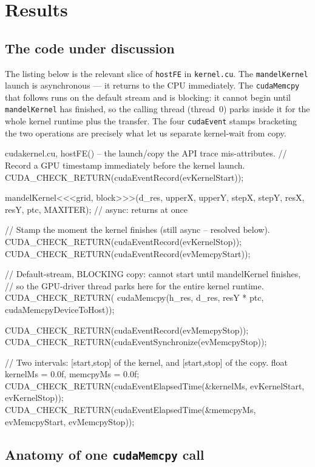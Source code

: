 \documentclass[
	english,
	letterpaper, oneside
]{article}
\begin{document}
\section{Results}

\subsection{The code under discussion}

The listing below is the relevant slice of \texttt{hostFE} in \texttt{kernel.cu}.
The \texttt{mandelKernel} launch is asynchronous --- it returns to the CPU
immediately. The \texttt{cudaMemcpy} that follows runs on the default
stream and is blocking: it cannot begin until \texttt{mandelKernel} has
finished, so the calling thread (thread~0) parks inside it for the whole kernel
runtime plus the transfer. The four \texttt{cudaEvent} stamps bracketing the two
operations are precisely what let us separate kernel-wait from copy.

\begin{sourcecode}{cuda}{kernel.cu, hostFE() -- the launch/copy the API trace mis-attributes.}
// Record a GPU timestamp immediately before the kernel launch.
CUDA_CHECK_RETURN(cudaEventRecord(evKernelStart));

mandelKernel<<<grid, block>>>(d_res, upperX, upperY, stepX, stepY,
                              resX, resY, ptc, MAXITER); // async: returns at once

// Stamp the moment the kernel finishes (still async -- resolved below).
CUDA_CHECK_RETURN(cudaEventRecord(evKernelStop));
CUDA_CHECK_RETURN(cudaEventRecord(evMemcpyStart));

// Default-stream, BLOCKING copy: cannot start until mandelKernel finishes,
// so the GPU-driver thread parks here for the entire kernel runtime.
CUDA_CHECK_RETURN(
    cudaMemcpy(h_res, d_res, resY * ptc, cudaMemcpyDeviceToHost));

CUDA_CHECK_RETURN(cudaEventRecord(evMemcpyStop));
CUDA_CHECK_RETURN(cudaEventSynchronize(evMemcpyStop));

// Two intervals: [start,stop] of the kernel, and [start,stop] of the copy.
float kernelMs = 0.0f, memcpyMs = 0.0f;
CUDA_CHECK_RETURN(cudaEventElapsedTime(&kernelMs, evKernelStart, evKernelStop));
CUDA_CHECK_RETURN(cudaEventElapsedTime(&memcpyMs, evMemcpyStart, evMemcpyStop));
\end{sourcecode}

\subsection{Anatomy of one \texttt{cudaMemcpy} call}
\end{document}

